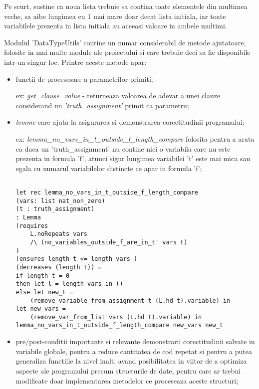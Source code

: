  Pe scurt, sustine ca noua lista trebuie sa contina toate elementele din multimea veche, sa aibe lungimea cu 1 mai mare doar decat lista initiala, iar toate variabilele prezenta in lista initiala au aceeasi valoare in ambele multimi.

Modulul 'DataTypeUtils' contine un numar considerabil de metode ajutatoare, folosite in mai multe module ale proiectului si care trebuie deci sa fie disponibile intr-un singur loc. Printre aceste metode apar:
\begin{itemize}
	\item  functii de procesesare a parametrilor primiti;
	
	ex: \textit{get\_clause\_value }- returneaza valoarea de adevar a unei clauze considerand un \textit{'truth\_assignment'} primit ca parametru;
	
	\item \textit{lemme} care ajuta la asigurarea si demonstrarea corectitudinii programului;
	
	ex: \textit{lemma\_no\_vars\_in\_t\_outside\_f\_length\_compare} folosita pentru a arata ca daca un 'truth\_assignment' nu contine nici o variabila care nu este prezenta in formula 'f', atunci sigur lungimea variabilei 't' este mai mica sau egala cu numarul variabilelor distincte ce apar in formula 'f';
	
	\begin{lstlisting}[]

let rec lemma_no_vars_in_t_outside_f_length_compare
(vars: list nat_non_zero) 
(t : truth_assignment) 
: Lemma
(requires 
	L.noRepeats vars 
	/\ (no_variables_outside_f_are_in_t' vars t)
)
(ensures length t <= length vars ) 
(decreases (length t)) = 
if length t = 0
then let l = length vars in ()
else let new_t = 
	(remove_variable_from_assignment t (L.hd t).variable) in
let new_vars = 
	(remove_var_from_list vars (L.hd t).variable) in
lemma_no_vars_in_t_outside_f_length_compare new_vars new_t

	\end{lstlisting}
	
	\item pre/post-conditii importante si relevante demonstrarii corectitudinii salvate in variabile globale, pentru a reduce cantitatea de cod repetat si pentru a putea \newline generaliza functiile la nivel inalt, avand posibilitatea in viitor de a optimiza \newline aspecte ale programului precum structurile de date, pentru care ar trebui \newline modificate doar implementarea metodelor ce proceseaza aceste structuri;
	

\end{itemize}
